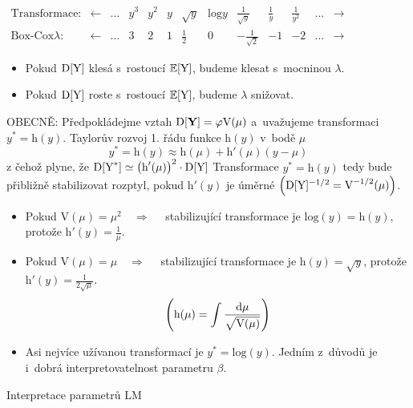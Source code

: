 \begin{table}[h]
\centering
 $ \begin{array}{ *{13}{c} }
\text{Transformace:} & \leftarrow &... &  y^3 &  y^2 &  y & \sqrt{y}  & \text{log}y & \frac{1}{\sqrt{y}}  & \frac{1}{y} & \frac{1}{y^2} &...  & \rightarrow \\
\text{Box-Cox} \lambda : &\leftarrow  &... & 3 & 2 & 1 & \frac{1}{2}  & 0 &  -\frac{1}{\sqrt{2}} & -1 & -2 &... & \rightarrow
\end{array} $
\end{table}

\begin{itemize}
\item Pokud $\mathrm{D}[\text{Y}]$ klesá s~rostoucí $\mathbb{E}[\text{Y}]$, budeme klesat s~mocninou $\lambda$.
\item Pokud $\mathrm{D}[\text{Y}]$ roste s~rostoucí $\mathbb{E}[\text{Y}]$, budeme $\lambda$ snižovat.
\end{itemize}

OBECNĚ: Předpokládejme vztah $\mathrm{D}[\textbf{Y}] = \varphi \text{V}(\mu)$ a~uvažujeme transformaci $y^* = \text{h}(y)$. Taylorův rozvoj 1. řádu funkce $\text{h}(y)$ v~bodě $\mu$
 $$
 y^* = \text{h}(y) \approx \text{h}(\mu) + \text{h}'(\mu)(y-\mu)
 $$
z čehož plyne, že $\mathrm{D}[\text{Y}^*] \simeq \big(\text{h}'(\mu)\big)^2 \cdot \mathrm{D}[\text{Y}]$
Transformace $y^* = \text{h}(y)$ tedy bude přibližně stabilizovat rozptyl, pokud $\text{h}'(y)$ je úměrné $\left(\mathrm{D}[\text{Y}]^{-1/2} = \text{V}^{-1/2}(\mu) \right)$.

\begin{itemize}
\item Pokud $\text{V}(\mu) = \mu^2 \quad \Rightarrow \quad$ stabilizující transformace je $\text{log}(y) = \text{h}(y)$, protože $\text{h}'(y) = \frac{1}{\mu}$.
\item Pokud $\text{V}(\mu) = \mu \quad \Rightarrow \quad$ stabilizující transformace je $\text{h}(y) = \sqrt{y}$, protože $\text{h}'(y) = \frac{1}{2 \sqrt{\mu}}$.
 $$
 \left(\text{h}(\mu) = \int \frac{\mathrm{d} \mu}{\sqrt{\text{V}(\mu)}} \right)
 $$
\item Asi nejvíce užívanou transformací je $y^* = \text{log}(y)$. Jedním z~důvodů je i~dobrá interpretovatelnost parametru $\beta$.
\end{itemize}

Interpretace parametrů LM

